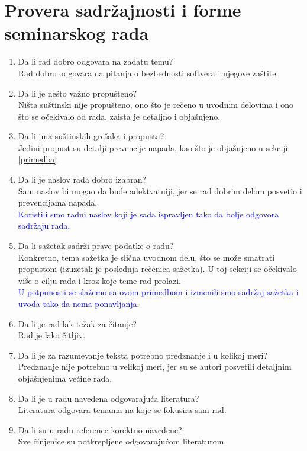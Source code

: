 \documentclass[a4paper]{report}
\newcommand{\odgovor}[1]{\textcolor{blue}{#1}}
\begin{document}
\section{Provera sadržajnosti i forme seminarskog rada}

\begin{enumerate}
\item Da li rad dobro odgovara na zadatu temu?\\
Rad dobro odgovara na pitanja o bezbednosti softvera i njegove zaštite.
\item Da li je nešto važno propušteno?\\
Ništa suštinski nije propušteno, ono što je rečeno u uvodnim delovima i ono što se očekivalo od rada, zaista je detaljno i objašnjeno.
\item Da li ima suštinskih grešaka i propusta?\\
Jedini propust su detalji prevencije napada, kao što je objašnjeno u sekciji \ref{primedba}
\item Da li je naslov rada dobro izabran?\\
Sam naslov bi mogao da bude adektvatniji, jer se rad dobrim delom posvetio i prevencijama napada.\\
\odgovor{Koristili smo radni naslov koji je sada ispravljen tako da bolje odgovora sadržaju rada.}
\item Da li sažetak sadrži prave podatke o radu?\\
Konkretno, tema sažetka je slična uvodnom delu, što se može smatrati propustom (izuzetak je poslednja rečenica sažetka). U toj sekciji se očekivalo više o cilju rada i kroz koje teme rad prolazi.\\
\odgovor{U potpunosti se slažemo sa ovom primedbom i izmenili smo sadržaj sažetka i uvoda tako da nema ponavljanja.}
\item Da li je rad lak-težak za čitanje?\\
Rad je lako čitljiv.
\item Da li je za razumevanje teksta potrebno predznanje i u kolikoj meri?\\
Predznanje nije potrebno u velikoj meri, jer su se autori posvetili detaljnim objašnjenima većine rada.
\item Da li je u radu navedena odgovarajuća literatura?\\
Literatura odgovara temama na koje se fokusira sam rad.
\item Da li su u radu reference korektno navedene?\\
Sve činjenice su potkrepljene odgovarajućom literaturom.

\end{enumerate}
\end{document}
